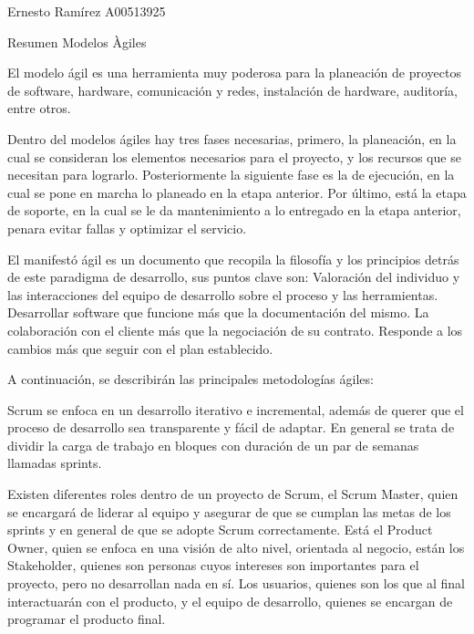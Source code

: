 \documentclass[12pt]{article}
\begin{document}
Ernesto Ramírez A00513925\par

Resumen Modelos Àgiles\par

El modelo ágil es una herramienta muy poderosa para la planeación de proyectos de software, hardware, comunicación y redes, instalación de hardware, auditoría, entre otros.\par

Dentro del modelos ágiles hay tres fases necesarias, primero, la planeación, en la cual se consideran los elementos necesarios para el proyecto, y los recursos que se necesitan para lograrlo. Posteriormente la siguiente fase es la de ejecución, en la cual se pone en marcha lo planeado en la etapa anterior. Por último, está la etapa de soporte, en la cual se le da mantenimiento a lo entregado en la etapa anterior, penara evitar fallas y optimizar el servicio.\par

\setlength{\parskip}{0.0pt}
El manifestó ágil es un documento que recopila la filosofía y los principios detrás de este paradigma de desarrollo, sus puntos clave son: Valoración del individuo y las interacciones del equipo de desarrollo sobre el proceso y las herramientas. Desarrollar software que funcione más que la documentación del mismo. La colaboración con el cliente más que la negociación de su contrato. Responde a los cambios más que seguir con el plan establecido.\par


\vspace{\baselineskip}
A continuación, se describirán las principales metodologías ágiles:\par


\vspace{\baselineskip}
Scrum se enfoca en un desarrollo iterativo e incremental, además de querer que el proceso de desarrollo sea transparente y fácil de adaptar. En general se trata de dividir la carga de trabajo en bloques con duración de un par de semanas llamadas sprints.\par


\vspace{\baselineskip}
Existen diferentes roles dentro de un proyecto de Scrum, el Scrum Master, quien se encargará de liderar al equipo y asegurar de que se cumplan las metas de los sprints y en general de que se adopte Scrum correctamente. Está el Product Owner, quien se enfoca en una visión de alto nivel, orientada al negocio, están los Stakeholder, quienes son personas cuyos intereses son importantes para el proyecto, pero no desarrollan nada en sí. Los usuarios, quienes son los que al final interactuarán con el producto, y el equipo de desarrollo, quienes se encargan de programar el producto final.\par
\end{document}
